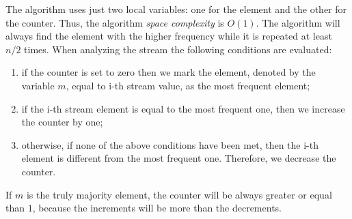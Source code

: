 \documentclass{article}
\begin{document}
\noindent The algorithm uses just two local variables: one for the element and the other for the counter. Thus, the algorithm  \textit{space complexity} is $O(1)$. The algorithm will always find the element with the higher frequency while it is repeated at least $n/2$ times. When analyzing the stream the following conditions are evaluated:
\begin{enumerate}
    \item if the counter is set to zero then we mark the element, denoted by the variable $m$, equal to i-th stream value, as the most frequent element;
    \item if the i-th stream element is equal to the most frequent one, then we increase the counter by one;
    \item otherwise, if none of the above conditions have been met, then the i-th element is different from the most frequent one. Therefore, we decrease the counter.
\end{enumerate}

\noindent If $m$ is the truly majority element, the counter will be always greater or equal than $1$, because the increments will be more than the decrements.
\end{document}
